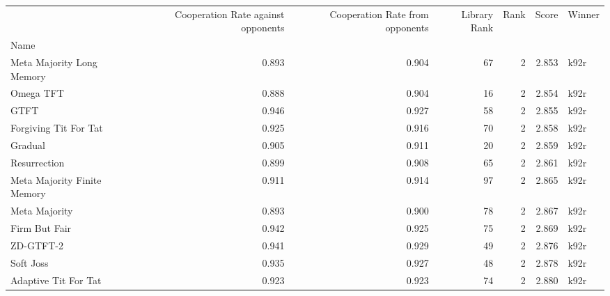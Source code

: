 \begin{tabular}{lrrrrrl}
\toprule
{} &  Cooperation Rate against opponents &  Cooperation Rate from opponents &  Library Rank &  Rank &  Score & Winner \\
Name                        &                                     &                                  &               &       &        &        \\
\midrule
Meta Majority Long Memory   &                               0.893 &                            0.904 &            67 &     2 &  2.853 &   k92r \\
Omega TFT                   &                               0.888 &                            0.904 &            16 &     2 &  2.854 &   k92r \\
GTFT                        &                               0.946 &                            0.927 &            58 &     2 &  2.855 &   k92r \\
Forgiving Tit For Tat       &                               0.925 &                            0.916 &            70 &     2 &  2.858 &   k92r \\
Gradual                     &                               0.905 &                            0.911 &            20 &     2 &  2.859 &   k92r \\
Resurrection                &                               0.899 &                            0.908 &            65 &     2 &  2.861 &   k92r \\
Meta Majority Finite Memory &                               0.911 &                            0.914 &            97 &     2 &  2.865 &   k92r \\
Meta Majority               &                               0.893 &                            0.900 &            78 &     2 &  2.867 &   k92r \\
Firm But Fair               &                               0.942 &                            0.925 &            75 &     2 &  2.869 &   k92r \\
ZD-GTFT-2                   &                               0.941 &                            0.929 &            49 &     2 &  2.876 &   k92r \\
Soft Joss                   &                               0.935 &                            0.927 &            48 &     2 &  2.878 &   k92r \\
Adaptive Tit For Tat        &                               0.923 &                            0.923 &            74 &     2 &  2.880 &   k92r \\

\end{tabular}
